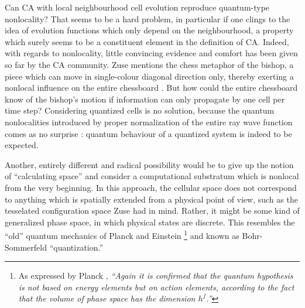 \documentclass[pre,preprint,showpacs,showkeys,amsfonts]{revtex4}
\begin{document}
Can CA with local neighbourhood cell evolution reproduce quantum-type nonlocality?
That seems to be a hard problem, in particular if one
clings to the idea of evolution functions which only depend on the neighbourhood,
a property which surely seems to be a constituent element in the definition of CA.
Indeed, with regards to nonlocality, little convincing evidence and
comfort has been given so far by the CA community.
Zuse mentions the chess metaphor of the bishop, a piece which can move in single-colour diagonal direction
only, thereby exerting a nonlocal influence on the entire  chessboard
\cite{zuse-94}.
But how could the entire   chessboard know
of the bishop's motion if information
can only propagate by one cell per time step?
Considering quantized cells is no solution,
because the quantum nonlocalities introduced by
proper normalization of the entire ray wave function
comes as no surprise
\cite{fu-groe-93}:
quantum behaviour of a quantized system
is indeed to be expected.

Another, entirely different and radical possibility would be
to give up the notion of ``calculating space'' and consider a
computational substratum which is nonlocal from the very beginning.
In this approach, the cellular space does not correspond to anything
which is spatially extended from a physical point of view,
such as the  tesselated configuration space  Zuse had in mind.
Rather, it might be some kind of generalized phase space, in which
physical states are discrete.
This resembles the ``old'' quantum mechanics
of Planck and Einstein
\footnote{
As expressed by Planck \cite[p. 387]{planck:1916},
{\it ``Again it is confirmed that the quantum hypothesis
is not based on energy elements but on action elements,
according to the fact that the volume of
phase space has the dimension $h^f$.''}
} and known as Bohr-Sommerfeld ``quantization.''
\end{document}
